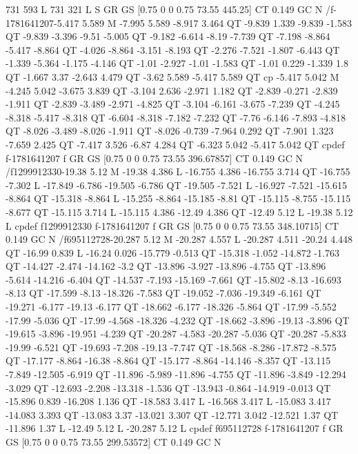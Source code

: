 731 593 L
731 321 L
S
GR
GS
[0.75 0 0 0.75 73.55 445.25] CT
0.149 GC
N
/f-1781641207{-5.417 5.589 M
-7.995 5.589 -8.917 3.464 QT
-9.839 1.339 -9.839 -1.583 QT
-9.839 -3.396 -9.51 -5.005 QT
-9.182 -6.614 -8.19 -7.739 QT
-7.198 -8.864 -5.417 -8.864 QT
-4.026 -8.864 -3.151 -8.193 QT
-2.276 -7.521 -1.807 -6.443 QT
-1.339 -5.364 -1.175 -4.146 QT
-1.01 -2.927 -1.01 -1.583 QT
-1.01 0.229 -1.339 1.8 QT
-1.667 3.37 -2.643 4.479 QT
-3.62 5.589 -5.417 5.589 QT
cp
-5.417 5.042 M
-4.245 5.042 -3.675 3.839 QT
-3.104 2.636 -2.971 1.182 QT
-2.839 -0.271 -2.839 -1.911 QT
-2.839 -3.489 -2.971 -4.825 QT
-3.104 -6.161 -3.675 -7.239 QT
-4.245 -8.318 -5.417 -8.318 QT
-6.604 -8.318 -7.182 -7.232 QT
-7.76 -6.146 -7.893 -4.818 QT
-8.026 -3.489 -8.026 -1.911 QT
-8.026 -0.739 -7.964 0.292 QT
-7.901 1.323 -7.659 2.425 QT
-7.417 3.526 -6.87 4.284 QT
-6.323 5.042 -5.417 5.042 QT
cp}def
f-1781641207
f
GR
GS
[0.75 0 0 0.75 73.55 396.67857] CT
0.149 GC
N
/f1299912330{-19.38 5.12 M
-19.38 4.386 L
-16.755 4.386 -16.755 3.714 QT
-16.755 -7.302 L
-17.849 -6.786 -19.505 -6.786 QT
-19.505 -7.521 L
-16.927 -7.521 -15.615 -8.864 QT
-15.318 -8.864 L
-15.255 -8.864 -15.185 -8.81 QT
-15.115 -8.755 -15.115 -8.677 QT
-15.115 3.714 L
-15.115 4.386 -12.49 4.386 QT
-12.49 5.12 L
-19.38 5.12 L
cp}def
f1299912330
f-1781641207
f
GR
GS
[0.75 0 0 0.75 73.55 348.10715] CT
0.149 GC
N
/f695112728{-20.287 5.12 M
-20.287 4.557 L
-20.287 4.511 -20.24 4.448 QT
-16.99 0.839 L
-16.24 0.026 -15.779 -0.513 QT
-15.318 -1.052 -14.872 -1.763 QT
-14.427 -2.474 -14.162 -3.2 QT
-13.896 -3.927 -13.896 -4.755 QT
-13.896 -5.614 -14.216 -6.404 QT
-14.537 -7.193 -15.169 -7.661 QT
-15.802 -8.13 -16.693 -8.13 QT
-17.599 -8.13 -18.326 -7.583 QT
-19.052 -7.036 -19.349 -6.161 QT
-19.271 -6.177 -19.13 -6.177 QT
-18.662 -6.177 -18.326 -5.864 QT
-17.99 -5.552 -17.99 -5.036 QT
-17.99 -4.568 -18.326 -4.232 QT
-18.662 -3.896 -19.13 -3.896 QT
-19.615 -3.896 -19.951 -4.239 QT
-20.287 -4.583 -20.287 -5.036 QT
-20.287 -5.833 -19.99 -6.521 QT
-19.693 -7.208 -19.13 -7.747 QT
-18.568 -8.286 -17.872 -8.575 QT
-17.177 -8.864 -16.38 -8.864 QT
-15.177 -8.864 -14.146 -8.357 QT
-13.115 -7.849 -12.505 -6.919 QT
-11.896 -5.989 -11.896 -4.755 QT
-11.896 -3.849 -12.294 -3.029 QT
-12.693 -2.208 -13.318 -1.536 QT
-13.943 -0.864 -14.919 -0.013 QT
-15.896 0.839 -16.208 1.136 QT
-18.583 3.417 L
-16.568 3.417 L
-15.083 3.417 -14.083 3.393 QT
-13.083 3.37 -13.021 3.307 QT
-12.771 3.042 -12.521 1.37 QT
-11.896 1.37 L
-12.49 5.12 L
-20.287 5.12 L
cp}def
f695112728
f-1781641207
f
GR
GS
[0.75 0 0 0.75 73.55 299.53572] CT
0.149 GC
N
